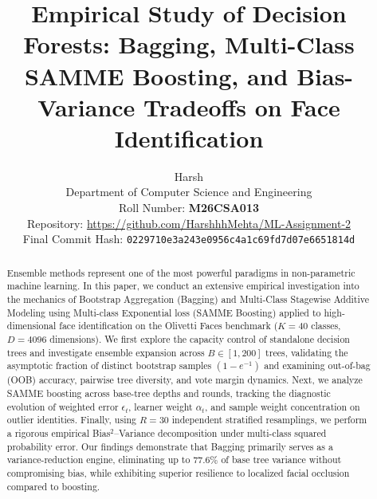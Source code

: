 \documentclass[10pt,twocolumn,letterpaper]{article}
\begin{document}
\title{Empirical Study of Decision Forests: Bagging, Multi-Class SAMME Boosting, and Bias-Variance Tradeoffs on Face Identification}

\author{
Harsh\\
Department of Computer Science and Engineering\\
Roll Number: \textbf{M26CSA013} \\
Repository: \url{https://github.com/HarshhhMehta/ML-Assignment-2} \\
Final Commit Hash: \texttt{0229710e3a243e0956c4a1c69fd7d07e6651814d}
}

\maketitle

\begin{abstract}
Ensemble methods represent one of the most powerful paradigms in non-parametric machine learning. In this paper, we conduct an extensive empirical investigation into the mechanics of Bootstrap Aggregation (Bagging) and Multi-Class Stagewise Additive Modeling using Multi-class Exponential loss (SAMME Boosting) applied to high-dimensional face identification on the Olivetti Faces benchmark ($K=40$ classes, $D=4096$ dimensions). We first explore the capacity control of standalone decision trees and investigate ensemble expansion across $B \in [1, 200]$ trees, validating the asymptotic fraction of distinct bootstrap samples $(1-e^{-1})$ and examining out-of-bag (OOB) accuracy, pairwise tree diversity, and vote margin dynamics. Next, we analyze SAMME boosting across base-tree depths and rounds, tracking the diagnostic evolution of weighted error $\epsilon_t$, learner weight $\alpha_t$, and sample weight concentration on outlier identities. Finally, using $R=30$ independent stratified resamplings, we perform a rigorous empirical Bias$^2$--Variance decomposition under multi-class squared probability error. Our findings demonstrate that Bagging primarily serves as a variance-reduction engine, eliminating up to $77.6\%$ of base tree variance without compromising bias, while exhibiting superior resilience to localized facial occlusion compared to boosting.
\end{abstract}

\end{document}
